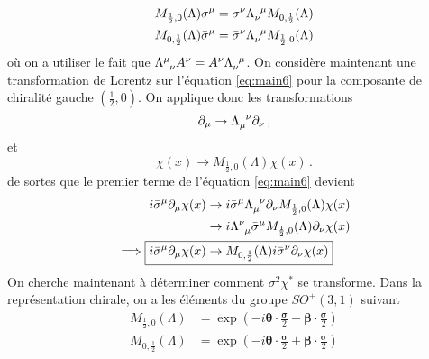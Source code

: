 \documentclass{article}
\numberwithin{equation}{section}
\theoremstyle{solution}
\begin{document}
\begin{equation}
\begin{split}
        M_{\frac{1}{2},0}(\Lambda)\sigma^{\mu}&= \sigma^{\nu}\Lambda\indices{_{\nu}^{\mu}}M_{0,\frac{1}{2}}(\Lambda) \\
        M_{0, \frac{1}{2}}(\Lambda)\bar{\sigma}^{\mu}&= \bar{\sigma}^{\nu}\Lambda\indices{_{\nu}^{\mu}} M_{\frac{1}{2},0}(\Lambda)
\end{split}
\end{equation} 
où on a utiliser le fait que $\Lambda\indices{^{\mu}_{\nu}}A^{\nu} = A^{\nu}\Lambda\indices{_{\nu}^{\mu}}$.
On considère maintenant une transformation de Lorentz sur l'équation \eqref{eq:main6} pour la composante de chiralité gauche $(\frac{1}{2}, 0)$. 
On applique donc les transformations
\begin{equation}
        \partial_{\mu} \rightarrow \Lambda\indices{_{\mu}^{\nu}}\partial_\nu\, ,
\end{equation} 
et
\begin{equation}
        \chi(x) \rightarrow M_{\frac{1}{2},0}(\Lambda)\chi(x)\, .
\end{equation} 
de sortes que le premier terme de l'équation \eqref{eq:main6} devient
\begin{align}
        \nonumber
       i \bar{\sigma}^{\mu}\partial_\mu \chi(x) 
       &\rightarrow  i \bar{\sigma}^{\mu}   \Lambda\indices{_{\mu}^{\nu}}\partial_\nu  M_{\frac{1}{2},0}(\Lambda)\chi(x)   \\
       \nonumber
      &\rightarrow  i \Lambda\indices{^{\nu}_{\mu}}\bar{\sigma}^{\mu} M_{\frac{1}{2},0}(\Lambda)\partial_\nu  \chi(x)   \\
      \label{eq:sol61}
        \implies \Aboxed{i \bar{\sigma}^{\mu}\partial_\mu \chi(x)   &\rightarrow   M_{0,\frac{1}{2}}(\Lambda)i\bar{\sigma}^{\nu}\partial_\nu \chi(x)}
\end{align}
On cherche maintenant à déterminer comment $\sigma^{2} \chi^{*}$ se transforme.
Dans la représentation chirale, on a les éléments du groupe $SO^{+}(3, 1)$ suivant
\begin{equation}
        \begin{split}
                M_{\frac{1}{2}, 0}(\Lambda) &= \exp \left( -i \boldsymbol{ \theta} \cdot \frac{\boldsymbol{ \sigma} }{2} - \boldsymbol{ \beta} \cdot \frac{\boldsymbol{ \sigma} }{2} \right) \\
                M_{0, \frac{1}{2}}(\Lambda) &= \exp \left( -i \boldsymbol{ \theta} \cdot \frac{\boldsymbol{ \sigma} }{2} + \boldsymbol{ \beta} \cdot \frac{\boldsymbol{ \sigma} }{2} \right)
        \end{split}
\end{equation} 
\end{document}
